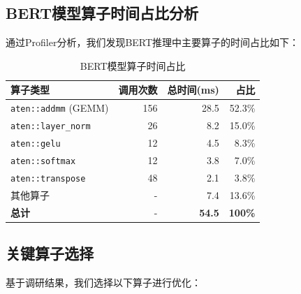 \documentclass[12pt,a4paper]{article}
\begin{document}
\subsection{BERT模型算子时间占比分析}

通过Profiler分析，我们发现BERT推理中主要算子的时间占比如下：

\begin{table}[H]
\centering
\caption{BERT模型算子时间占比}
\begin{tabular}{lrrr}
\toprule
\textbf{算子类型} & \textbf{调用次数} & \textbf{总时间(ms)} & \textbf{占比} \\
\midrule
\texttt{aten::addmm} (GEMM) & 156 & 28.5 & 52.3\% \\
\texttt{aten::layer\_norm} & 26 & 8.2 & 15.0\% \\
\texttt{aten::gelu} & 12 & 4.5 & 8.3\% \\
\texttt{aten::softmax} & 12 & 3.8 & 7.0\% \\
\texttt{aten::transpose} & 48 & 2.1 & 3.8\% \\
其他算子 & - & 7.4 & 13.6\% \\
\midrule
\textbf{总计} & - & \textbf{54.5} & \textbf{100\%} \\
\bottomrule
\end{tabular}
\end{table}

\subsection{关键算子选择}

基于调研结果，我们选择以下算子进行优化：
\end{document}
